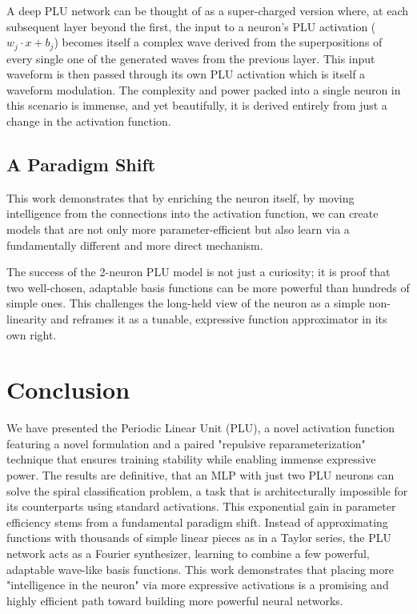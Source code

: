 \documentclass[11pt, letterpaper]{article}
\begin{document}
A deep PLU network can be thought of as a super-charged version where, at each subsequent layer beyond the first, the input to a neuron's PLU activation ($w_j \cdot x + b_j$) becomes itself a complex wave derived from the superpositions of every single one of the generated waves from the previous layer. This input waveform is then passed through its own PLU activation which is itself a waveform modulation. The complexity and power packed into a single neuron in this scenario is immense, and yet beautifully, it is derived entirely from just a change in the activation function.

\subsection{A Paradigm Shift}

This work demonstrates that by enriching the neuron itself, by moving intelligence from the connections into the activation function, we can create models that are not only more parameter-efficient but also learn via a fundamentally different and more direct mechanism.

The success of the 2-neuron PLU model is not just a curiosity; it is proof that two well-chosen, adaptable basis functions can be more powerful than hundreds of simple ones. This challenges the long-held view of the neuron as a simple non-linearity and reframes it as a tunable, expressive function approximator in its own right.

\section{Conclusion}

We have presented the Periodic Linear Unit (PLU), a novel activation function featuring a novel formulation and a paired "repulsive reparameterization" technique that ensures training stability while enabling immense expressive power. The results are definitive, that an MLP with just two PLU neurons can solve the spiral classification problem, a task that is architecturally impossible for its counterparts using standard activations. This exponential gain in parameter efficiency stems from a fundamental paradigm shift. Instead of approximating functions with thousands of simple linear pieces as in a Taylor series, the PLU network acts as a Fourier synthesizer, learning to combine a few powerful, adaptable wave-like basis functions. This work demonstrates that placing more "intelligence in the neuron" via more expressive activations is a promising and highly efficient path toward building more powerful neural networks.
\end{document}
